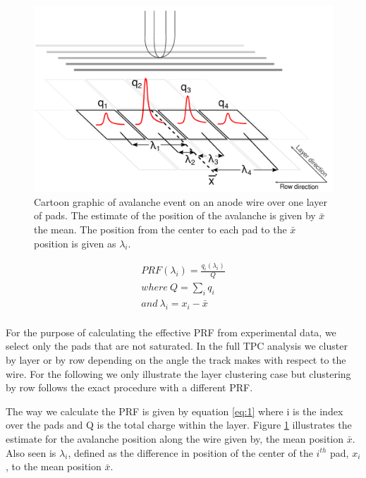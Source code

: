 \documentclass[review]{elsarticle}
\begin{document}
\begin{figure}[H]
\includegraphics[width=\linewidth]{defofavalanche}
\caption{Cartoon graphic of avalanche event on an anode wire over one layer of pads. The estimate of the position of the avalanche is given by $\bar{x}$  the mean. The position from the center to each pad to the $\bar{x}$ position is given as $\lambda_i$.}
\label{fig:av}
\end{figure}

\begin{equation}\label{eq:1}
\begin{split}
PRF(\lambda_i) = \frac{q_i(\lambda_i)}{Q}\\
where \ Q=\sum_i q_i\\
and \   \lambda_i=x_i-\bar{x}\\
\end{split}
\end{equation}

For the purpose of calculating the effective PRF from experimental data, we select only the pads that are not saturated. In the full TPC analysis we cluster by layer or by row depending on the angle the track makes with respect to the wire. For the following we only illustrate the layer clustering case but clustering by row follows the exact procedure with a different PRF. 

The way we calculate the PRF is given by equation \ref{eq:1} where i is the index over the pads and Q is the total charge within the layer. Figure \ref{fig:av}  illustrates the estimate for the avalanche position along the wire given by, the mean position $\bar{x}$. Also seen is $\lambda_i$, defined as the difference in position of the center of the $i^{th}$ pad, $x_i$, to the mean position $\bar{x}$. 
\end{document}
